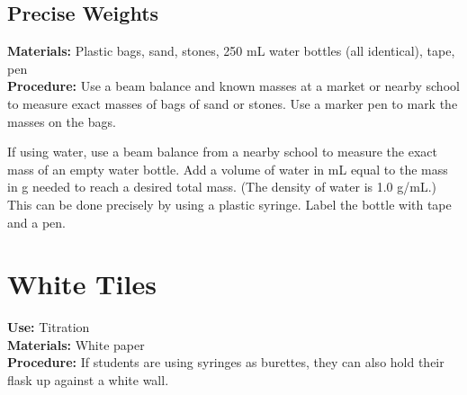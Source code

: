 \begin{multicols}{2}
\subsection{Precise Weights}
\vspace{-6pt}
\textbf{Materials:} Plastic bags, sand, stones, 250 mL water bottles (all identical), tape, pen\\
\textbf{Procedure:} 
Use a beam balance and known masses at a market or nearby school to measure exact masses of bags of sand or stones.  Use a marker pen to mark the masses on the bags. 

If using water, use a beam balance from a nearby school to measure the exact mass of an empty water bottle. Add a volume of water in mL equal to the mass in g needed to reach a desired total mass. (The density of water is 1.0 g/mL.) This can be done precisely by using a plastic syringe. Label the bottle with tape and a pen.

\section{White Tiles}
\label{sec:white-tiles}
\vspace{-10pt}
\textbf{Use:} Titration\\
\textbf{Materials:} White paper\\
\textbf{Procedure:} If students are using syringes as burettes, they can also hold their flask up against a white wall.


\end{multicols}

